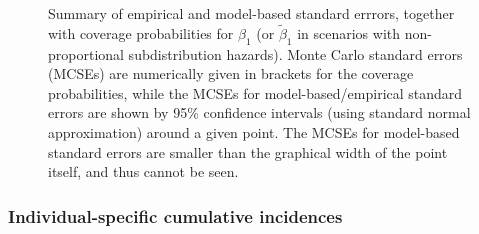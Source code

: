 \documentclass[
  letterpaper,
  DIV=11,
  numbers=noendperiod]{scrreprt}
\begin{document}
\begin{figure}


\caption{\label{fig-perf-X}Summary of empirical and model-based standard
errrors, together with coverage probabilities for \(\beta_1\) (or
\(\tilde{\beta}_1\) in scenarios with non-proportional subdistribution
hazards). Monte Carlo standard errors (MCSEs) are numerically given in
brackets for the coverage probabilities, while the MCSEs for
model-based/empirical standard errors are shown by 95\% confidence
intervals (using standard normal approximation) around a given point.
The MCSEs for model-based standard errors are smaller than the graphical
width of the point itself, and thus cannot be seen.}

\end{figure}%

\subsubsection{Individual-specific cumulative
incidences}\label{individual-specific-cumulative-incidences}
\end{document}
